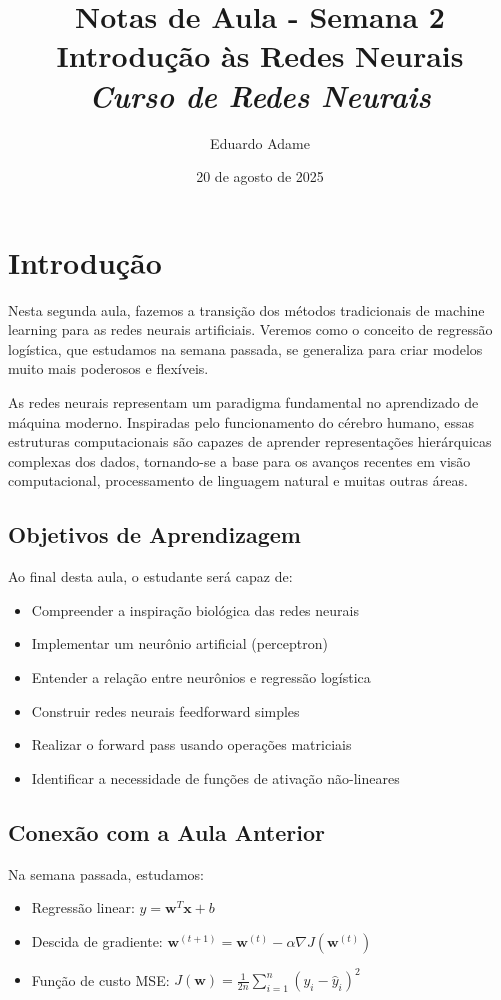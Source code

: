 \documentclass[a4paper,12pt]{article}
\title{Notas de Aula - Semana 2 \\
       \large Introdução às Redes Neurais\\
       \itshape Curso de Redes Neurais}
\author{Eduardo Adame}
\date{20 de agosto de 2025}
\begin{document}
\maketitle

\tableofcontents
\newpage

\section{Introdução}

Nesta segunda aula, fazemos a transição dos métodos tradicionais de machine learning para as redes neurais artificiais. Veremos como o conceito de regressão logística, que estudamos na semana passada, se generaliza para criar modelos muito mais poderosos e flexíveis.

As redes neurais representam um paradigma fundamental no aprendizado de máquina moderno. Inspiradas pelo funcionamento do cérebro humano, essas estruturas computacionais são capazes de aprender representações hierárquicas complexas dos dados, tornando-se a base para os avanços recentes em visão computacional, processamento de linguagem natural e muitas outras áreas.

\subsection{Objetivos de Aprendizagem}

Ao final desta aula, o estudante será capaz de:
\begin{itemize}
    \item Compreender a inspiração biológica das redes neurais
    \item Implementar um neurônio artificial (perceptron)
    \item Entender a relação entre neurônios e regressão logística
    \item Construir redes neurais feedforward simples
    \item Realizar o forward pass usando operações matriciais
    \item Identificar a necessidade de funções de ativação não-lineares
\end{itemize}

\subsection{Conexão com a Aula Anterior}

Na semana passada, estudamos:
\begin{itemize}
    \item Regressão linear: $y = \mathbf{w}^T\mathbf{x} + b$
    \item Descida de gradiente: $\mathbf{w}^{(t+1)} = \mathbf{w}^{(t)} - \alpha \nabla J(\mathbf{w}^{(t)})$
    \item Função de custo MSE: $J(\mathbf{w}) = \frac{1}{2n}\sum_{i=1}^{n}(y_i - \hat{y}_i)^2$
\end{itemize}
\end{document}
